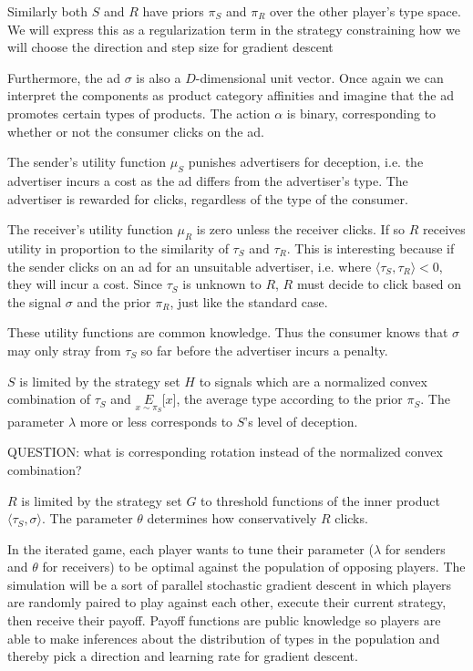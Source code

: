 \documentclass{article}
\begin{document}
Similarly both $S$ and $R$ have priors $\pi_S$ and $\pi_R$ over the other player's type space. We will express this as a regularization term in the strategy constraining how we will choose the direction and step size for gradient descent

Furthermore, the ad $\sigma$ is also a $D$-dimensional unit vector. Once again we can interpret the components as product category affinities and imagine that the ad promotes certain types of products. The action $\alpha$ is binary, corresponding to whether or not the consumer clicks on the ad.

The sender's utility function $\mu_S$ punishes advertisers for deception, i.e. the advertiser incurs a cost as the ad differs from the advertiser's type. The advertiser is rewarded for clicks, regardless of the type of the consumer.

The receiver's utility function $\mu_R$ is zero unless the receiver clicks. If so $R$ receives utility in proportion to the similarity of $\tau_S$ and $\tau_R$. This is interesting because if the sender clicks on an ad for an unsuitable advertiser, i.e. where $\langle \tau_S, \tau_R \rangle < 0$, they will incur a cost. Since $\tau_S$ is unknown to $R$, $R$ must decide to click based on the signal $\sigma$ and the prior $\pi_R$, just like the standard case.

These utility functions are common knowledge. Thus the consumer knows that $\sigma$ may only stray from $\tau_S$ so far before the advertiser incurs a penalty.

$S$ is limited by the strategy set $H$ to signals which are a normalized convex combination of $\tau_S$ and $\underset{x\sim\pi_S}{E}\lbrack x \rbrack$, the average type according to the prior $\pi_S$. The parameter $\lambda$ more or less corresponds to $S$'s level of deception.

QUESTION: what is corresponding rotation instead of the normalized convex combination?

$R$ is limited by the strategy set $G$ to threshold functions of the inner product $\langle \tau_S, \sigma \rangle$. The parameter $\theta$ determines how conservatively $R$ clicks.

In the iterated game, each player wants to tune their parameter ($\lambda$ for senders and $\theta$ for receivers) to be optimal against the population of opposing players. The simulation will be a sort of parallel stochastic gradient descent in which players are randomly paired to play against each other, execute their current strategy, then receive their payoff. Payoff functions are public knowledge so players are able to make inferences about the distribution of types in the population and thereby pick a direction and learning rate for gradient descent.
\end{document}
